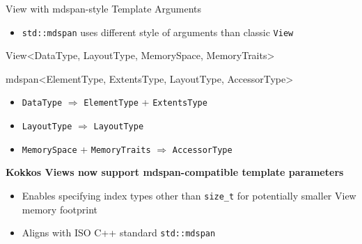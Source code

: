 \begin{frame}[fragile]{View with mdspan-style Template Arguments}


  \begin{itemize}
    \item \texttt{std::mdspan} uses different style of arguments than classic \texttt{View}
  \end{itemize}

  \begin{code}[keywords={DataType,LayoutType,MemorySpace,MemoryTraits,ElementType,ExtentsType,LayoutType,AccessorType}]
    View<DataType, LayoutType, MemorySpace, MemoryTraits>

    mdspan<ElementType, ExtentsType, LayoutType, AccessorType>
  \end{code}

  \begin{itemize}
     \item{\texttt{DataType} $\Rightarrow$ \texttt{ElementType} + \texttt{ExtentsType}}
     \item{\texttt{LayoutType} $\Rightarrow$ \texttt{LayoutType}}
     \item{\texttt{MemorySpace} + \texttt{MemoryTraits} $\Rightarrow$ \texttt{AccessorType}}
  \end{itemize}
  \vspace{15pt}

  \textbf{Kokkos Views now support mdspan-compatible template parameters}
  \begin{itemize}
    \item Enables specifying index types other than \texttt{size\_t} for potentially smaller View memory footprint
    \item Aligns with ISO C++ standard \texttt{std::mdspan}
  \end{itemize}

\end{frame}

